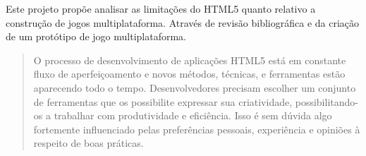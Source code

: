 Este projeto propõe analisar as limitações do HTML5 quanto relativo
a construção de jogos multiplataforma. Através de revisão
bibliográfica e da criação de um protótipo de jogo multiplataforma.




\cite{crossPlatformMobileGame}
\begin{quote}
O processo de desenvolvimento de aplicações HTML5 está em constante
fluxo de aperfeiçoamento e novos métodos, técnicas, e ferramentas
estão aparecendo todo o tempo. Desenvolvedores precisam escolher um
conjunto de ferramentas que os possibilite expressar sua criatividade,
possibilitando-os a trabalhar com produtividade e eficiência. Isso é
sem dúvida algo fortemente influenciado pelas preferências pessoais,
experiência e opiniões à respeito de boas práticas.
\end{quote}
